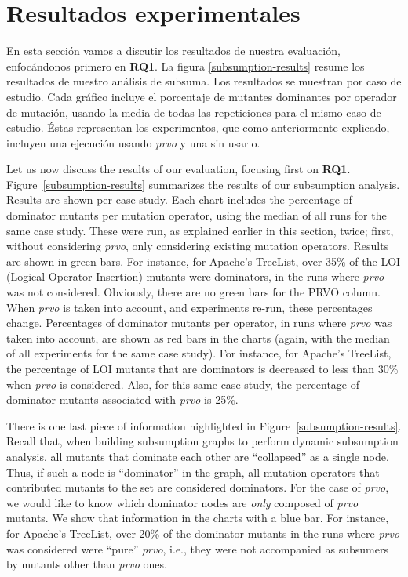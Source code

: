 \section{Resultados experimentales}

En esta secci\'on vamos a discutir los resultados de nuestra evaluaci\'on, enfoc\'andonos primero en \textbf{RQ1}. La figura \ref{subsumption-results} resume los resultados de nuestro an\'alisis de subsuma. Los resultados se muestran por caso de estudio. Cada gr\'afico incluye el porcentaje de mutantes dominantes por operador de mutaci\'on, usando la media de todas las repeticiones para el mismo caso de estudio. \'Estas representan los experimentos, que como anteriormente explicado, incluyen una ejecuci\'on usando \emph{prvo} y una sin usarlo.

Let us now discuss the results of our evaluation, focusing first on \textbf{RQ1}. Figure~\ref{subsumption-results} summarizes the results of our subsumption analysis. Results are shown per case study. Each chart includes the percentage of dominator mutants per mutation operator, using the median of all runs for the same case study. These were run, as explained earlier in this section, twice; first, without considering \emph{prvo}, only considering existing mutation operators. Results are shown in green bars. For instance, for Apache's TreeList, over 35\% of the LOI (Logical Operator Insertion) mutants were dominators, in the runs where \emph{prvo} was not considered. Obviously, there are no green bars for the PRVO column. When \emph{prvo} is taken into account, and experiments re-run, these percentages change. Percentages of dominator mutants per operator, in runs where \emph{prvo} was taken into account, are shown as red bars in the charts (again, with the median of all experiments for the same case study). For instance, for Apache's TreeList, the percentage of LOI mutants that are dominators is decreased to less than 30\% when \emph{prvo} is considered. Also, for this same case study, the percentage of dominator mutants associated with \emph{prvo} is 25\%. 

There is one last piece of information highlighted in Figure~\ref{subsumption-results}. Recall that, when building subsumption graphs to perform dynamic subsumption analysis, all mutants that dominate each other are ``collapsed'' as a single node. Thus, if such a node is ``dominator'' in the graph, all mutation operators that contributed mutants to the set are considered dominators. For the case of \emph{prvo}, we would like to know which dominator nodes are \emph{only} composed of \emph{prvo} mutants. We show that information in the charts with a blue bar. For instance, for Apache's TreeList, over 20\% of the dominator mutants in the runs where \emph{prvo} was considered were ``pure'' \emph{prvo}, i.e., they were not accompanied as subsumers by mutants other than \emph{prvo} ones. 

